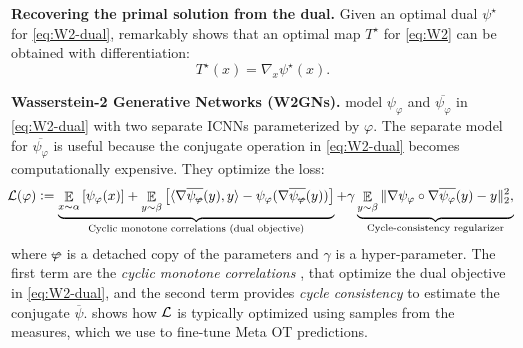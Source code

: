 \documentclass{article}
\newcommand{\defeq}{\vcentcolon=}
\begin{document}
\textbf{Recovering the primal solution from the dual.}
Given an optimal dual $\psi^\star$ for \cref{eq:W2-dual},
\citet{brenier1991polar} remarkably shows that an optimal map
$T^\star$ for \cref{eq:W2} can be obtained with differentiation:
\begin{equation}
  T^\star(x) = \nabla_x \psi^\star(x).
  \label{eq:W2-dual-to-primal}
\end{equation}

\textbf{Wasserstein-2 Generative Networks (W2GNs).}
\citet{korotin2019wasserstein} model $\psi_\varphi$ and
$\overline{\psi_\varphi}$ in \cref{eq:W2-dual} with two separate
ICNNs parameterized by $\varphi$.
The separate model for $\overline{\psi_\varphi}$ is useful because
the conjugate operation in \cref{eq:W2-dual} becomes
computationally expensive.
They optimize the loss:
\newcommand{\detachedphi}{\text{\sout{\ensuremath{\varphi}}}}
\begin{equation}
  \hspace{-1mm}
  \gL(\varphi) \defeq
    \underbrace{\E_{x\sim \alpha} \left[ \psi_\varphi(x)\right] +
      \E_{y\sim \beta} \left[ \langle \nabla\overline{\psi_\detachedphi}(y), y\rangle -
      \psi_\varphi(\nabla\overline{\psi_\detachedphi}(y)) \right]}_{\text{Cyclic monotone correlations (dual objective)}}
  + \gamma \underbrace{
    \E_{y\sim \beta} \|\nabla\psi_\varphi\circ \nabla\overline{\psi_\varphi}(y)-y\|_2^2,
  }_{\text{Cycle-consistency regularizer}}
  \label{eq:w2gn-loss}
\end{equation}
where $\detachedphi$ is a detached copy of the parameters
and $\gamma$ is a hyper-parameter.
The first term are the
\emph{cyclic monotone correlations}
\citep{chartrand2009gradient,taghvaei2019wasserstein},
that optimize the dual objective in \cref{eq:W2-dual},
and the second term provides \emph{cycle consistency}
\citep{zhu2017unpaired} to estimate the conjugate $\overline \psi$.
 shows how ${\mathcal{L}}$ is typically optimized
using samples from the measures, which we use to
fine-tune Meta OT predictions.
\end{document}
